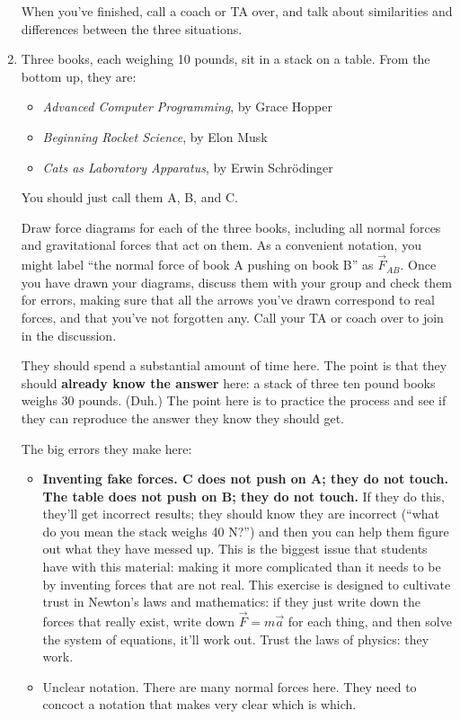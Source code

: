 \documentclass[12pt]{article}
\newcommand{\BI}{\begin{itemize}}
\newcommand{\EI}{\end{itemize}}
\newcommand{\vsi}{\vspace{0.1in}}
\begin{document}
\begin{enumerate}
    When you've finished, call a coach or TA over, and talk about similarities and differences between the three situations. 


\item Three books, each weighing 10 pounds, sit in a stack on a table. From the bottom up, they are:
  \BI
\item {\it Advanced Computer Programming}, by Grace Hopper
\item {\it Beginning Rocket Science}, by Elon Musk
\item {\it Cats as Laboratory Apparatus}, by Erwin Schr\"odinger
  \EI
     
     You should just call them A, B, and C. 

     Draw force diagrams for each of the three books, including all normal forces and gravitational forces that act on them. As a convenient notation, you might label ``the normal force of book A pushing on book B'' as $\vec F_{AB}$.
Once you have drawn your diagrams, discuss them with your group and check them for errors, making sure that all the arrows you've drawn correspond to real forces, and that you've not forgotten any. Call your TA or coach over to 
join in the discussion.

{\color{Red}
They should spend a substantial amount of time here. The point is that they should {\bf already know the answer} here: a stack of three ten pound books weighs 30 pounds. (Duh.) The point here is to practice the process and see if they can reproduce the answer they know they should get.

The big errors they make here:

\begin{itemize}
	\item {\bf Inventing fake forces. C does not push on A; they do not touch. The table does not push on B; they do not touch.} If they do this, they'll get incorrect results; they should know they are incorrect (``what do you mean the stack weighs 40 N?'') and then you can help them figure out what they have messed up. This is the biggest issue that students have with this material: making it more complicated than it needs to be by inventing forces that are not real. This exercise is designed to cultivate trust in Newton's laws and mathematics: if they just write down the forces that really exist, write down $\vec F = m \vec a$ for each thing, and then solve the system of equations, it'll work out. Trust the laws of physics: they work.
	\item Unclear notation. There are many normal forces here. They need to concoct a notation that makes very clear which is which.
\end{itemize}
}
\vsi\vsi\vsi


\end{enumerate}
\end{document}
